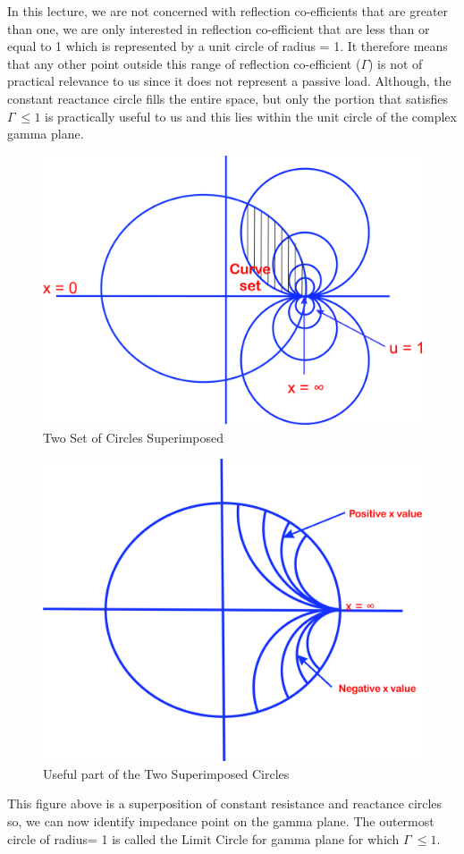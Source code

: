 In this lecture, we are not concerned with reflection co-efficients that are greater than one, we are only interested in reflection co-efficient that are less than or equal to 1 which is represented by a unit circle of radius = 1. It therefore means that any other point outside this range of reflection co-efficient ($\Gamma$) is not of practical relevance to us since it does not represent a passive load.  Although, the constant reactance circle fills the entire space, but only the portion that satisfies $ \Gamma\ \leq 1$ is practically useful to us and this lies within the unit circle of the complex gamma plane.
\begin{figure}[h]
\centering
\includegraphics[width=0.5\linewidth]{./graphics/ijnbvcxw}
\caption{Two Set of Circles Superimposed}
\label{fig:ijnbvcxw}
\end{figure}
\begin{figure}[h]
\centering
\includegraphics[width=0.5\linewidth]{./graphics/sddfghj}
\caption{Useful part of the Two Superimposed Circles}
\label{fig:sddfghj}
\end{figure}

This figure above is a superposition of constant resistance and reactance circles so, we can now identify impedance point on the gamma plane.  The outermost circle of radius= 1 is called the Limit Circle for gamma plane for which $ \Gamma\ \leq 1$.\\

